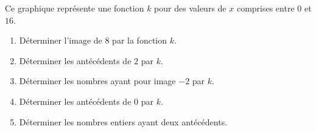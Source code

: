 \begin{exercice}
    Ce graphique représente une fonction $k$ pour des valeurs de $x$ comprises entre $0$ et $16$.
    
    \begin{enumerate}
        \item Déterminer l'image de $8$ par la fonction $k$.
        \item Déterminer les antécédents de $2$ par $k$.
        \item Déterminer les nombres ayant pour image $-2$ par $k$.
        \item Déterminer les antécédents de $0$ par $k$.
        \item Déterminer les nombres entiers ayant deux antécédents.
    \end{enumerate}
\end{exercice}
\begin{corrige}
 
\end{corrige}
